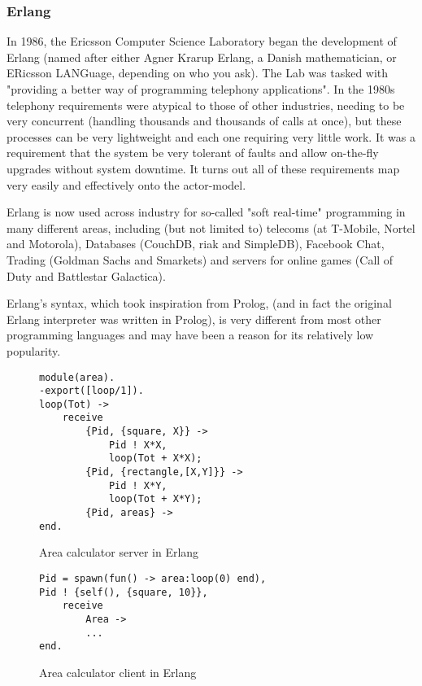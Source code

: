 \documentclass{article}
\begin{document}
\subsubsection{Erlang}

In 1986, the Ericsson Computer Science Laboratory began the development of Erlang\cite{armstrong2007} (named after either Agner Krarup Erlang, a Danish mathematician, or ERicsson LANGuage, depending on who you ask).
The Lab was tasked with "providing a better way of programming telephony applications". 
In the 1980s telephony requirements were atypical to those of other industries, needing to be very concurrent (handling thousands and thousands of calls at once), but these processes can be very lightweight and each one requiring very little work.
It was a requirement that the system be very tolerant of faults and allow on-the-fly upgrades without system downtime.
It turns out all of these requirements map very easily and effectively onto the actor-model.

Erlang is now used across industry for so-called "soft real-time" programming in many different areas, including (but not limited to) telecoms (at T-Mobile, Nortel and Motorola), Databases (CouchDB, riak and SimpleDB), Facebook Chat, Trading (Goldman Sachs and Smarkets) and servers for online games (Call of Duty and Battlestar Galactica).

Erlang's syntax, which took inspiration from Prolog, (and in fact the original Erlang interpreter was written in Prolog), is very different from most other programming languages and may have been a reason for its relatively low popularity.

\begin{figure}[H]
\begin{verbatim}
module(area).
-export([loop/1]).
loop(Tot) ->
    receive
        {Pid, {square, X}} ->
            Pid ! X*X,
            loop(Tot + X*X);
        {Pid, {rectangle,[X,Y]}} ->
            Pid ! X*Y,
            loop(Tot + X*Y);
        {Pid, areas} ->
end.
\end{verbatim}
\caption{Area calculator server in Erlang}
\label{fig:example_erlang_server}
\end{figure}

\begin{figure}[H]
\begin{verbatim}
Pid = spawn(fun() -> area:loop(0) end),
Pid ! {self(), {square, 10}},
    receive
        Area ->
        ...
end.
\end{verbatim}
\caption{Area calculator client in Erlang}
\label{fig:example_erlang_client}
\end{figure}
\end{document}
